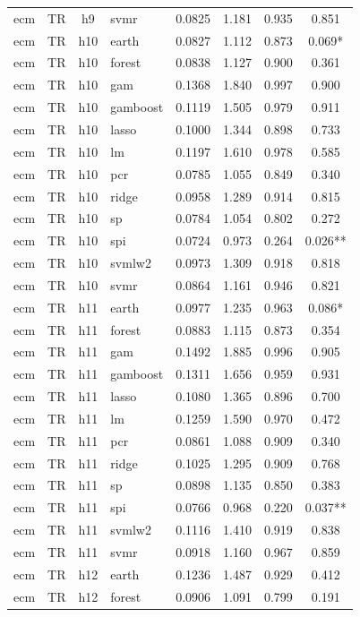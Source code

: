 \begin{ThreePartTable}
\begin{longtable}[t]{llclcccc}
ecm & TR & h9 & svmr & 0.0825 & 1.181 & 0.935 & 0.851\\
\addlinespace
ecm & TR & h10 & earth & 0.0827 & 1.112 & 0.873 & 0.069*\\
ecm & TR & h10 & forest & 0.0838 & 1.127 & 0.900 & 0.361\\
ecm & TR & h10 & gam & 0.1368 & 1.840 & 0.997 & 0.900\\
ecm & TR & h10 & gamboost & 0.1119 & 1.505 & 0.979 & 0.911\\
ecm & TR & h10 & lasso & 0.1000 & 1.344 & 0.898 & 0.733\\
ecm & TR & h10 & lm & 0.1197 & 1.610 & 0.978 & 0.585\\
ecm & TR & h10 & pcr & 0.0785 & 1.055 & 0.849 & 0.340\\
ecm & TR & h10 & ridge & 0.0958 & 1.289 & 0.914 & 0.815\\
ecm & TR & h10 & sp & 0.0784 & 1.054 & 0.802 & 0.272\\
ecm & TR & h10 & spi & 0.0724 & 0.973 & 0.264 & 0.026**\\
ecm & TR & h10 & svmlw2 & 0.0973 & 1.309 & 0.918 & 0.818\\
ecm & TR & h10 & svmr & 0.0864 & 1.161 & 0.946 & 0.821\\
\addlinespace
ecm & TR & h11 & earth & 0.0977 & 1.235 & 0.963 & 0.086*\\
ecm & TR & h11 & forest & 0.0883 & 1.115 & 0.873 & 0.354\\
ecm & TR & h11 & gam & 0.1492 & 1.885 & 0.996 & 0.905\\
ecm & TR & h11 & gamboost & 0.1311 & 1.656 & 0.959 & 0.931\\
ecm & TR & h11 & lasso & 0.1080 & 1.365 & 0.896 & 0.700\\
ecm & TR & h11 & lm & 0.1259 & 1.590 & 0.970 & 0.472\\
ecm & TR & h11 & pcr & 0.0861 & 1.088 & 0.909 & 0.340\\
ecm & TR & h11 & ridge & 0.1025 & 1.295 & 0.909 & 0.768\\
ecm & TR & h11 & sp & 0.0898 & 1.135 & 0.850 & 0.383\\
ecm & TR & h11 & spi & 0.0766 & 0.968 & 0.220 & 0.037**\\
ecm & TR & h11 & svmlw2 & 0.1116 & 1.410 & 0.919 & 0.838\\
ecm & TR & h11 & svmr & 0.0918 & 1.160 & 0.967 & 0.859\\
\addlinespace
ecm & TR & h12 & earth & 0.1236 & 1.487 & 0.929 & 0.412\\
ecm & TR & h12 & forest & 0.0906 & 1.091 & 0.799 & 0.191\\

\end{longtable}
\end{ThreePartTable}
